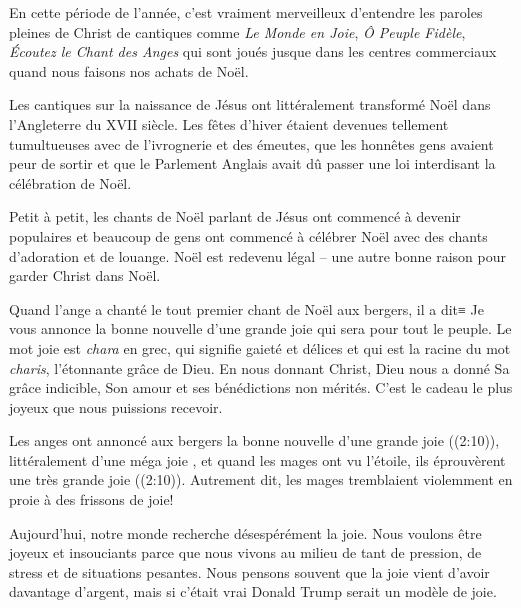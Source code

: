


En cette période de l'année, c'est vraiment merveilleux d'entendre les paroles \og pleines de Christ \fg{} de cantiques comme \emph{Le Monde en Joie}, \emph{Ô Peuple Fidèle}, \emph{Écoutez le Chant des Anges} qui sont joués jusque dans les centres commerciaux quand nous faisons nos achats de Noël.

Les cantiques sur la naissance de Jésus ont littéralement transformé Noël dans l'Angleterre du XVII siècle. Les fêtes d'hiver étaient devenues tellement tumultueuses avec de l'ivrognerie et des émeutes, que les honnêtes gens avaient peur de sortir et que le Parlement Anglais avait dû passer une loi interdisant la célébration de Noël.

Petit à petit, les chants de Noël parlant de Jésus ont commencé à devenir populaires et beaucoup de gens ont commencé à célébrer Noël avec des chants d'adoration et de louange. Noël est redevenu légal – une autre bonne raison pour garder Christ dans Noël.

Quand l'ange a chanté le tout premier chant de Noël aux bergers, il a dit≡ \og Je vous annonce la bonne nouvelle d’une grande joie qui sera pour tout le peuple. \fg{} Le mot \og joie \fg{} est \emph{chara} en grec, qui signifie \og gaieté et délices \fg{} et qui est la racine du mot \emph{charis}, l'étonnante grâce de Dieu. En nous donnant Christ, Dieu nous a donné Sa grâce indicible, Son amour et ses bénédictions non mérités. C'est le cadeau le plus joyeux que nous puissions recevoir.

Les anges ont annoncé aux bergers la \og bonne nouvelle d'une grande joie \fg{} ((2:10)), littéralement d'une \og méga joie \fg{}, et quand les mages ont vu l'étoile, \og ils éprouvèrent une très grande joie \fg{} ((2:10)). Autrement dit, les mages \og tremblaient violemment en proie à des frissons de joie! \fg{}

Aujourd'hui, notre monde recherche désespérément la joie. Nous voulons être joyeux et insouciants parce que nous vivons au milieu de tant de pression, de stress et de situations pesantes. Nous pensons souvent que la joie vient d'avoir davantage d'argent, mais si c'était vrai Donald Trump serait un modèle de joie.

